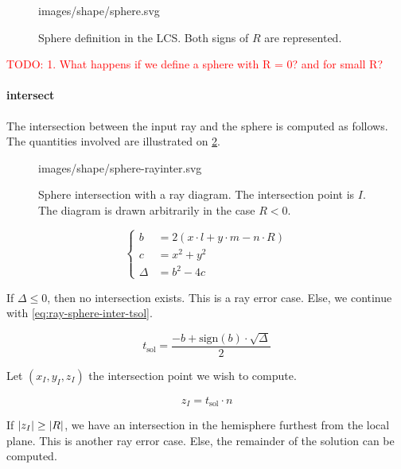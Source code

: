 \begin{figure} \caption{\label{fig:sphere-def-lcs} Sphere definition
in the LCS. Both signs of $R$ are represented.}

           {images/shape/sphere.svg}
\end{figure}

\textcolor{red}{TODO:
1. What happens if we define a sphere with R = 0? and for small R?
}

\paragraph{intersect}
The intersection between the input ray and the sphere is computed as
follows. The quantities involved are illustrated on \cref{fig:sphere-inter}.

\begin{figure} \caption{\label{fig:sphere-inter} Sphere intersection with
a ray diagram. The intersection point is $I$. The diagram is drawn arbitrarily
in the case $R<0$.}

           {images/shape/sphere-rayinter.svg}
\end{figure}

\begin{equation} \label{eq:ray-sphere-inter1}
\begin{cases}
b &= 2 (x \cdot l + y \cdot m - n \cdot R) \\
c &= x^2 + y^2 \\
\Delta &= b^2 - 4 c
\end{cases}
\end{equation}

If $\Delta \leq 0$, then no intersection exists. This is a ray error case.
Else, we continue with \cref{eq:ray-sphere-inter-tsol}.

\begin{equation} \label{eq:ray-sphere-inter-tsol}
t_\textrm{sol} = \frac{-b + \textrm{sign}(b) \cdot \sqrt{\Delta}}{2}
\end{equation}

Let $(x_I, y_I, z_I)$ the intersection point we wish to compute.

\begin{equation}
z_I = t_\textrm{sol} \cdot n
\end{equation}

If $\abs{z_I} \geq \abs{R}$, we have an intersection in the hemisphere furthest
from the local plane. This is another ray error case. Else, the remainder of
the solution can be computed.

